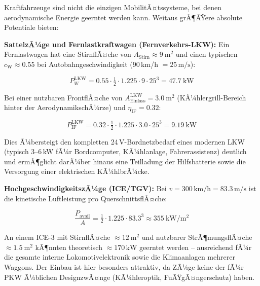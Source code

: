 ﻿\documentclass[12pt, a4paper]{report}
\theoremstyle{definition}
\theoremstyle{remark}
\newcommand{\cW}{c_{\text{W}}}
\newcommand{\Astirnfl}{A_{\text{Stirn}}}
\newcommand{\Aeinlass}{A_{\text{Einlass}}}
\begin{document}
Kraftfahrzeuge sind nicht die einzigen MobilitÃ¤tssysteme, bei denen aerodynamische
Energie geerntet werden kann. Weitaus grÃ¶ÃŸere absolute Potentiale bieten:

\textbf{SattelzÃ¼ge und Fernlastkraftwagen (Fernverkehrs-LKW):}
Ein Fernlast\-wagen hat eine StirnflÃ¤che von $\Astirnfl \approx \SI{9}{\metre\squared}$
und einen typischen $\cW \approx 0.55$ bei Autobahngeschwindigkeit
(90\,km/h $= 25\,\text{m/s}$):

\begin{equation}
  P_W^{\text{LKW}} = 0.55 \cdot \tfrac{1}{2} \cdot 1.225 \cdot 9 \cdot 25^3
  = \SI{47.7}{\kilo\watt}
  \label{eq:pw_lkw}
\end{equation}

Bei einer nutzbaren FrontflÃ¤che von $\Aeinlass^{\text{LKW}} = \SI{3.0}{\metre\squared}$
(KÃ¼hlergrill-Bereich hinter der AerodynamikschÃ¼rze) und $\eta_{\text{IF}} = 0.32$:

\begin{equation}
  P_{\text{IF}}^{\text{LKW}} = 0.32 \cdot \tfrac{1}{2} \cdot 1.225 \cdot 3.0 \cdot 25^3
  = \SI{9.19}{\kilo\watt}
  \label{eq:p_if_lkw}
\end{equation}

Dies Ã¼bersteigt den kompletten 24\,V-Bordnetz\-bedarf eines modernen LKW
(typisch 3--6\,kW fÃ¼r Bordcomputer, KÃ¼hlanlage, Fahrerassistenz) deutlich
und ermÃ¶glicht darÃ¼ber hinaus eine Teilladung der Hilfsbatterie sowie die
Versorgung einer elektrischen KÃ¼hlbrÃ¼cke.

\textbf{HochgeschwindigkeitszÃ¼ge (ICE/TGV):}
Bei $v = 300\,\text{km/h} = 83.3\,\text{m/s}$ ist die kinetische Luftleistung
pro QuerschnittsflÃ¤che:

\begin{equation}
  \frac{P_{\text{avail}}}{A} = \tfrac{1}{2} \cdot 1.225 \cdot 83.3^3
  \approx \SI{355}{\kilo\watt\per\metre\squared}
  \label{eq:p_avail_zug}
\end{equation}

An einem ICE-3 mit StirnflÃ¤che $\approx \SI{12}{\metre\squared}$ und
nutzbarer StrÃ¶mungsflÃ¤che $\approx \SI{1.5}{\metre\squared}$ kÃ¶nnten
theoretisch $\approx 170\,\text{kW}$ geerntet werden -- ausreichend fÃ¼r
die gesamte interne Lokomotivelektronik sowie die Klimaanlagen mehrerer
Waggons. Der Einbau ist hier besonders attraktiv, da ZÃ¼ge keine der
fÃ¼r PKW Ã¼blichen DesignzwÃ¤nge (KÃ¼hleroptik, FuÃŸgÃ¤ngerschutz) haben.

\end{document}
